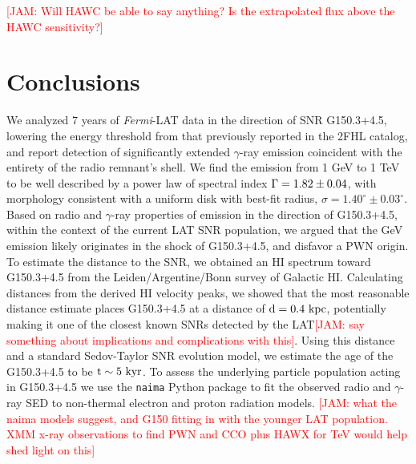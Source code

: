 \documentclass[iop]{emulateapj}
\newcommand{\kibitz}[2]{\ifnum\Comments=1\textcolor{#1}{#2}\fi}
\newcommand{\jamie}[1]{\kibitz{red}      {[JAM: #1]}}
\newcommand{\gam}{$\gamma$-ray}
\newcommand{\FermiLat}{\emph{Fermi}-LAT }     %
\newcommand{\nai}{{\tt naima}}
\newcommand{\Gone}{G150.3+4.5}
\begin{document}
\jamie{Will HAWC be able to say anything? Is the extrapolated flux above the HAWC sensitivity?}



%
%
\section{Conclusions}\label{G150:Conc}
We analyzed 7 years of \FermiLat{} data in the direction of SNR \Gone{}, lowering the energy threshold from that previously reported in the 2FHL catalog, and report detection of significantly extended \gam{} emission coincident with the entirety of the radio remnant's shell. We find the emission from 1 GeV to 1 TeV to be well described by a power law of spectral index ${\Gamma = \rm 1.82 \pm 0.04}$, with  morphology consistent with a uniform disk with best-fit radius, {\rm $\sigma = 1.40^{\circ} \pm 0.03^{\circ}$}.  Based on radio and  \gam{} properties of emission in the direction of \Gone{}, within the context of the current LAT SNR population, we argued that the GeV emission likely originates in the shock of \Gone{}, and disfavor a PWN origin. To estimate the distance to the SNR, we obtained  an HI spectrum toward \Gone{} from the Leiden/Argentine/Bonn survey of Galactic HI. Calculating distances from the derived HI velocity peaks, we showed that the most reasonable distance estimate places \Gone{} at a distance of ${\rm d = 0.4~kpc}$, potentially making it one of the closest known SNRs detected by the LAT\jamie{say something about implications and complications with this}. Using this distance and a standard Sedov-Taylor SNR evolution model, we estimate the age of the \Gone{} to be ${\rm t \sim 5~kyr}$. %
To assess the underlying particle population acting in \Gone{} we use the \nai{} Python package to fit the observed radio and \gam{} SED to non-thermal electron and proton radiation models. \jamie{what the naima models suggest, and G150 fitting in with the younger LAT population. XMM x-ray observations to find PWN and CCO plus HAWX for TeV would help shed light on this} %
\end{document}
